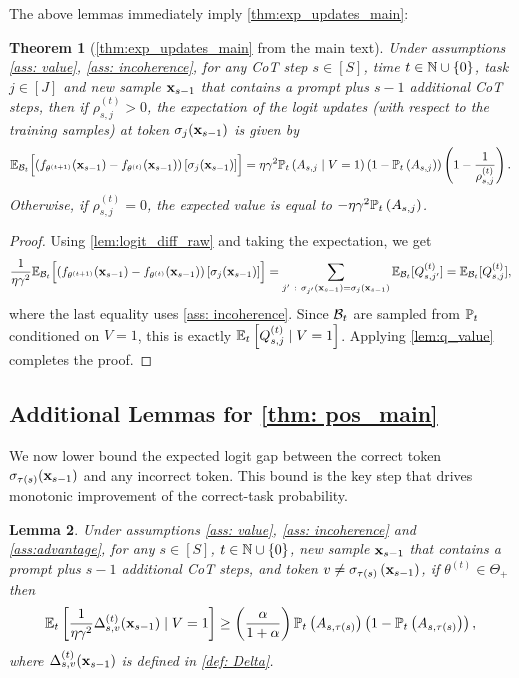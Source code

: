 \documentclass{article}
\theoremstyle{plain}
\newtheorem{theorem}{Theorem}[section]
\newtheorem{lemma}[theorem]{Lemma}
\theoremstyle{definition}
\theoremstyle{remark}
\begin{document}
The above lemmas immediately imply \cref{thm:exp_updates_main}:
\begin{theorem}[\cref{thm:exp_updates_main} from the main text]\label{thm:exp_updates}
    Under assumptions \ref{ass: value}, \ref{ass: incoherence}, for any CoT step $s\in[S]$, time $t \in \N \cup \{0\}$, task $j\in[J]$ and new sample $\bx_{s-1}$ that contains a prompt plus $s-1$ additional CoT steps, then if $\rho_{s, j}^{(t)} > 0$, the expectation of the logit updates (with respect to the training samples) at token $\sigma_j(\bx_{s-1})$ is given by 
    \begin{align*}
        \E_{\Bcal_t}\Bigl[\left(f_{\theta^{(t+1)}}(\bx_{s-1}) - f_{\theta^{(t)}}(\bx_{s-1})\right)[\sigma_j(\bx_{s-1})]\Bigr] = \eta \gamma^2 \P_t\left(A_{s,j} \mid V=1\right)\left(1 - \P_t\left(A_{s,j}\right)\right)\left(1 - \frac{1}{\rho_{s, j}^{(t)}}\right).
    \end{align*}
    Otherwise, if $\rho_{s, j}^{(t)} =  0$, the expected value is equal to $- \eta \gamma^2\P_t\left(A_{s,j}\right)$.
\end{theorem}
\begin{proof}
    Using \cref{lem:logit_diff_raw} and taking the expectation, we get
    \begin{align*}
         \frac{1}{\eta \gamma^2}\E_{\Bcal_t}\Bigl[\left(f_{\theta^{(t+1)}}(\bx_{s-1}) - f_{\theta^{(t)}}(\bx_{s-1})\right)[\sigma_j(\bx_{s-1})]\Bigr] =  \sum_{j' ~:~  \sigma_{j'}(\bx_{s-1}) = \sigma_{j}(\bx_{s-1})} \E_{\Bcal_t}[Q_{s, j'}^{(t)}] = \E_{\Bcal_t}[Q_{s, j}^{(t)}],
    \end{align*}
    where the last equality uses \cref{ass: incoherence}. Since $\Bcal_t$ are sampled from $\P_t$ conditioned on $V=1$, this is exactly $\E_t\left[Q^{(t)}_{s, j} \mid V=1\right]$. Applying \cref{lem:q_value} completes the proof. 
\end{proof}


\subsection{Additional Lemmas for \cref{thm: pos_main}}
We now lower bound the expected logit gap between the correct token
$\sigma_{\tau(s)}(\bx_{s-1})$ and any incorrect token.
This bound is the key step that drives monotonic improvement of the correct-task probability.
\begin{lemma}\label{lem:delta_diff_exp}
    Under assumptions \ref{ass: value}, \ref{ass: incoherence} and \cref{ass:advantage}, for any $s\in[S]$, $t \in \N \cup \{0\}$, new sample $\bx_{s-1}$ that contains a prompt plus $s-1$ additional CoT steps, and token $v \neq \sigma_{\tau(s)}\left(\bx_{s-1}\right)$, if $\theta^{(t)} \in \Theta_+$ then
    \begin{align*}
        \E_t\left[\frac{1}{\eta \gamma^2} \Delta^{(t)}_{s, v}( \bx_{s-1}) \mid V=1\right] 
        \geq \left(\frac{\alpha}{1+\alpha}\right) \P_t\left(A_{s, \tau(s)} \right)\left(1 - \P_t\left(A_{s, \tau(s)} \right)\right),  
    \end{align*}
    where $\Delta^{(t)}_{s, v}( \bx_{s-1})$ is defined in \eqref{def: Delta}.
\end{lemma}
\end{document}
